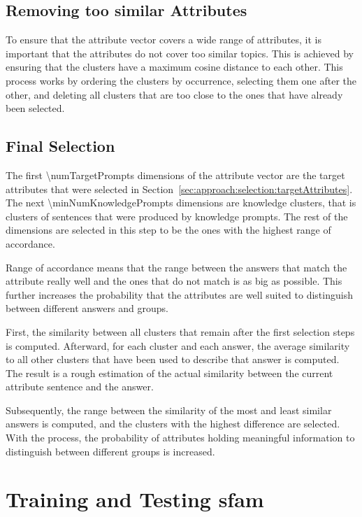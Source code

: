 \subsection{Removing too similar Attributes}
\label{sec:approach:selection:removeSimilar}
To ensure that the attribute vector covers a wide range of attributes, it is important that the attributes do not cover too similar topics. This is achieved by ensuring that the clusters have a maximum cosine distance to each other. This process works by ordering the clusters by occurrence, selecting them one after the other, and deleting all clusters that are too close to the ones that have already been selected.

\subsection{Final Selection} %
\label{sec:approach:selection:finalSelection}
The first \num{\numTargetPrompts} dimensions of the attribute vector are the target attributes that were selected in Section~\ref{sec:approach:selection:targetAttributes}. The next \num{\minNumKnowledgePrompts} dimensions are knowledge clusters, that is clusters of sentences that were produced by knowledge prompts. The rest of the dimensions are selected in this step to be the ones with the highest range of accordance. %

Range of accordance means that the range between the answers that match the attribute really well and the ones that do not match is as big as possible. This further increases the probability that the attributes are well suited to distinguish between different answers and groups.

First, the similarity between all clusters that remain after the first selection steps is computed. Afterward, for each cluster and each answer, the average similarity to all other clusters that have been used to describe that answer is computed. The result is a rough estimation of the actual similarity between the current attribute sentence and the answer.

Subsequently, the range between the similarity of the most and least similar answers is computed, and the clusters with the highest difference are selected. With the process, the probability of attributes holding meaningful information to distinguish between different groups is increased.


\section{Training and Testing \acs{sfam}}
\label{sec:approach:sfam}


